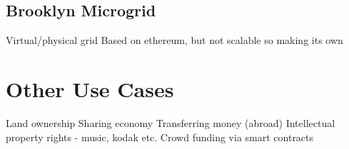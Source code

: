 \subsection{Brooklyn Microgrid} \label{Brooklyn}

Virtual/physical grid %
Based on ethereum, but not scalable so making its own


\section{Other Use Cases}
Land ownership
Sharing economy
Transferring money (abroad)
Intellectual property rights - music, kodak etc.  
Crowd funding via smart contracts 